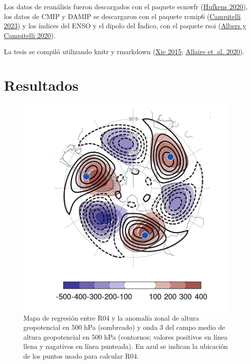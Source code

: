 \documentclass[12pt,oneside,a4paper]{reedthesis}
\begin{document}
Los datos de reanálisis fueron descargados con el paquete ecmwfr (\protect\hyperlink{ref-hufkens2020}{Hufkens 2020}), los datos de CMIP y DAMIP se descargaron con el paquete rcmip6 (\protect\hyperlink{ref-rcmip6}{Campitelli 2023}) y los índices del ENSO y el dipolo del Índico, con el paquete rsoi (\protect\hyperlink{ref-albers2020}{Albers y Campitelli 2020}).

La tesis se compiló utilizando knitr y rmarkdown (\protect\hyperlink{ref-xie2015}{Xie 2015}; \protect\hyperlink{ref-allaire2020}{Allaire et~al. 2020}).

\hypertarget{resultados}{%
\section{Resultados}\label{resultados}}

\begin{figure}

{\centering \includegraphics{figures/15-onda3/raphael-regr-1} 

}

\caption{Mapa de regresión entre R04 y la anomalía zonal de altura geopotencial en 500 hPa (sombreado) y onda 3 del campo medio de altura geopotencial en 500 hPa (contornos; valores positivos en línea llena y nagativos en línea punteada). En azul se indican la ubicación de los puntos usado para calcular R04.}\label{fig:raphael-regr}
\end{figure}
\end{document}
